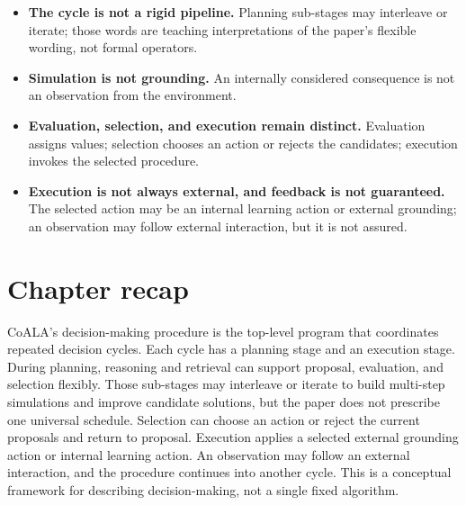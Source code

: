 \begin{itemize}
  \item \textbf{The cycle is not a rigid pipeline.} Planning sub-stages may interleave or iterate; those words are teaching interpretations of the paper's flexible wording, not formal operators.
  \item \textbf{Simulation is not grounding.} An internally considered consequence is not an observation from the environment.
  \item \textbf{Evaluation, selection, and execution remain distinct.} Evaluation assigns values; selection chooses an action or rejects the candidates; execution invokes the selected procedure.
  \item \textbf{Execution is not always external, and feedback is not guaranteed.} The selected action may be an internal learning action or external grounding; an observation may follow external interaction, but it is not assured.
\end{itemize}

\section{Chapter recap}
\label{sec:complete-process-recap}

\begin{chapterrecap}
CoALA's decision-making procedure is the top-level program that coordinates repeated decision cycles. Each cycle has a planning stage and an execution stage. During planning, reasoning and retrieval can support proposal, evaluation, and selection flexibly. Those sub-stages may interleave or iterate to build multi-step simulations and improve candidate solutions, but the paper does not prescribe one universal schedule. Selection can choose an action or reject the current proposals and return to proposal. Execution applies a selected external grounding action or internal learning action. An observation may follow an external interaction, and the procedure continues into another cycle. This is a conceptual framework for describing decision-making, not a single fixed algorithm.
\end{chapterrecap}

